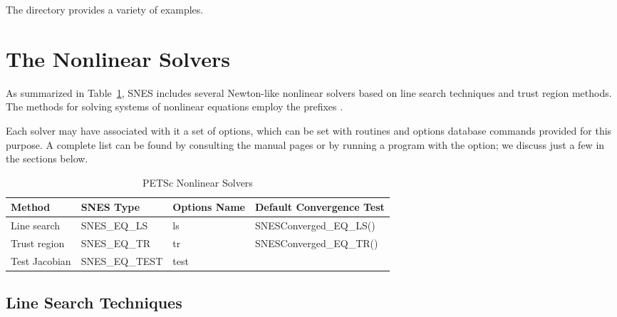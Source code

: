 The directory  provides
a variety of examples.


\section{The Nonlinear Solvers}
\label{sec:nlsolvers}

As summarized in Table~\ref{tab:snesdefaults}, SNES includes several
Newton-like nonlinear solvers based on line search techniques and
trust region methods.  The methods for solving systems of nonlinear
equations employ the prefixes
.

Each solver may have associated with it a set of options, which can be
set with routines and options database commands provided for this
purpose.  A complete list can be found by consulting the manual pages
or by running a program with the  option; we discuss just a
few in the sections below.

\begin{table}
\begin{center}
\begin{tabular}{llll}
{\bf Method}    &{\bf SNES Type}& {\bf Options Name}    &{\bf Default Convergence Test}\\
\hline
Line search     & SNES\_EQ\_LS   & ls   & SNESConverged\_EQ\_LS()\\
Trust region    & SNES\_EQ\_TR   & tr   & SNESConverged\_EQ\_TR()\\
Test Jacobian   & SNES\_EQ\_TEST        & test  & \\
\hline
\end{tabular}
\end{center}
\label{tab:snesdefaults}
\caption{PETSc Nonlinear Solvers}
\end{table}

\subsection{Line Search Techniques} 

